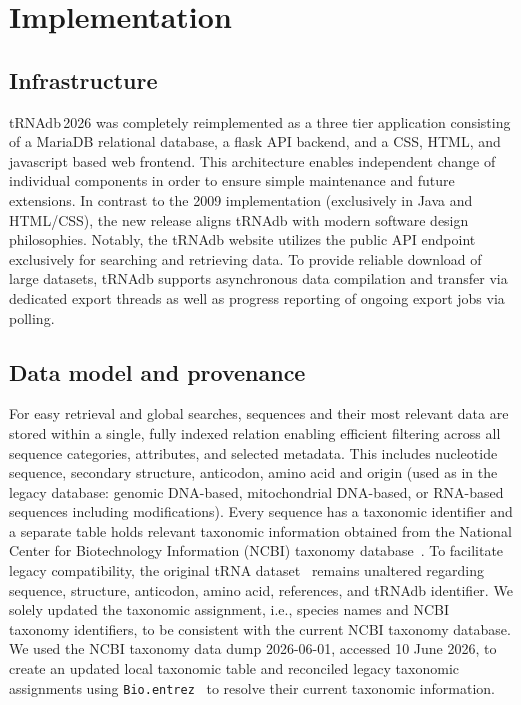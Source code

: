 \documentclass[unnumsec,webpdf,contemporary,large]{oup-authoring-template}
\begin{document}
\section{Implementation}

\subsection{Infrastructure}

tRNAdb\,2026 was completely reimplemented as a three tier application
consisting of a MariaDB relational database, a flask API backend, and a
CSS, HTML, and javascript based web frontend. This architecture enables
independent change of individual components in order to ensure simple
maintenance and future extensions. In contrast to the 2009 implementation
(exclusively in Java and HTML/CSS), the new release aligns tRNAdb with
modern software design philosophies. Notably, the tRNAdb website utilizes
the public API endpoint exclusively for searching and retrieving data. To
provide reliable download of large datasets, tRNAdb supports asynchronous
data compilation and transfer via dedicated export threads as well as
progress reporting of ongoing export jobs via polling.

\subsection{Data model and provenance}

For easy retrieval and global searches, sequences and their most relevant
data are stored within a single, fully indexed relation enabling efficient
filtering across all sequence categories, attributes, and selected
metadata. This includes nucleotide sequence, secondary structure,
anticodon, amino acid and origin (used as in the legacy database: genomic
DNA-based, mitochondrial DNA-based, or RNA-based sequences including
modifications). Every sequence has a taxonomic identifier and a separate
table holds relevant taxonomic information obtained from the National
Center for Biotechnology Information (NCBI) taxonomy
database~\cite{ncbitaxonomy2020}. To facilitate legacy compatibility, the
original tRNA dataset~\cite{juehling:2009} remains unaltered regarding
sequence, structure, anticodon, amino acid, references, and tRNAdb
identifier. We solely updated the taxonomic assignment, i.e., species names
and NCBI taxonomy identifiers, to be consistent with the current NCBI
taxonomy database. We used the NCBI taxonomy data dump 2026-06-01, accessed
10 June 2026, to create an updated local taxonomic table and reconciled
legacy taxonomic assignments using \texttt{Bio.entrez}~\cite{biopython2009}
to resolve their current taxonomic information.
\end{document}
